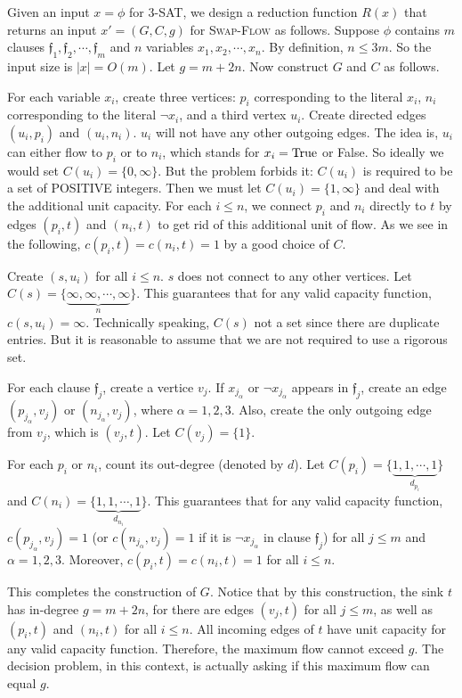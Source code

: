\documentclass{article}
\begin{document}
Given an input $x=\phi$ for \textsc{3-SAT}, we design a reduction function $R(x)$ that returns an input $x'=(G,C,g)$ for \textsc{Swap-Flow} as follows. Suppose $\phi$ contains $m$ clauses $\mathfrak{f}_1,\mathfrak{f}_2,\cdots,\mathfrak{f}_m$ and $n$ variables $x_1,x_2,\cdots,x_n$. By definition, $n\leqslant 3m$. So the input size is $|x|=O(m)$. Let $g=m+2n$. Now construct $G$ and $C$ as follows.

For each variable $x_i$, create three vertices: $p_i$ corresponding to the literal $x_i$, $n_i$ corresponding to the literal $\neg x_i$, and a third vertex $u_i$. Create directed edges $(u_i,p_i)$ and $(u_i,n_i)$. $u_i$ will not have any other outgoing edges. The idea is, $u_i$ can either flow to $p_i$ or to $n_i$, which stands for $x_i=\textup{True}$ or False. So ideally we would set $C(u_i)=\{0,\infty\}$. But the problem forbids it: $C(u_i)$ is required to be a set of POSITIVE integers. Then we must let $C(u_i)=\{1,\infty\}$ and deal with the additional unit capacity. For each $i\leqslant n$, we connect $p_i$ and $n_i$ directly to $t$ by edges $(p_i,t)$ and $(n_i,t)$ to get rid of this additional unit of flow. As we see in the following, $c(p_i,t)=c(n_i,t)=1$ by a good choice of $C$.

Create $(s,u_i)$ for all $i\leqslant n$. $s$ does not connect to any other vertices. Let $C(s)=\{\underbrace{\infty,\infty,\cdots,\infty}_n\}$. This guarantees that for any valid capacity function, $c(s,u_i)=\infty$. Technically speaking, $C(s)$ not a set since there are duplicate entries. But it is reasonable to assume that we are not required to use a rigorous set.

For each clause $\mathfrak{f}_j$, create a vertice $v_j$. If $x_{j_\alpha}$ or $\neg x_{j_\alpha}$ appears in $\mathfrak{f}_j$, create an edge $(p_{j_\alpha},v_j)$ or $(n_{j_\alpha},v_j)$, where $\alpha=1,2,3$. Also, create the only outgoing edge from $v_j$, which is $(v_j,t)$. Let $C(v_j)=\{1\}$.

For each $p_i$ or $n_i$, count its out-degree (denoted by $d$). Let $C(p_i)=\{\underbrace{1,1,\cdots,1}_{d_{p_i}}\}$ and $C(n_i)=\{\underbrace{1,1,\cdots,1}_{d_{n_i}}\}$. This guarantees that for any valid capacity function, $c(p_{j_\alpha},v_j)=1$ (or $c(n_{j_\alpha},v_j)=1$ if it is $\neg x_{j_\alpha}$ in clause $\mathfrak{f}_j$) for all $j\leqslant m$ and $\alpha=1,2,3$. Moreover, $c(p_i,t)=c(n_i,t)=1$ for all $i\leqslant n$.

This completes the construction of $G$. Notice that by this construction, the sink $t$ has in-degree $g=m+2n$, for there are edges $(v_j,t)$ for all $j\leqslant m$, as well as $(p_i,t)$ and $(n_i,t)$ for all $i\leqslant n$. All incoming edges of $t$ have unit capacity for any valid capacity function. Therefore, the maximum flow cannot exceed $g$. The decision problem, in this context, is actually asking if this maximum flow can equal $g$.
\end{document}
